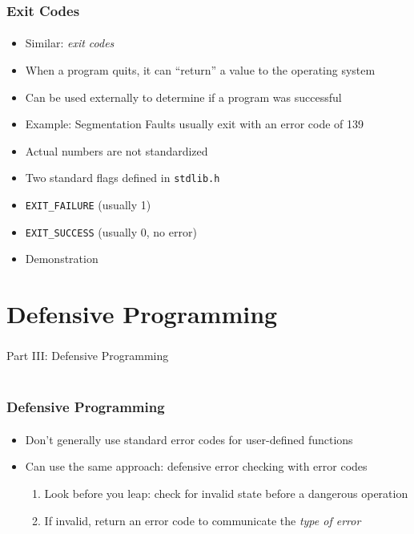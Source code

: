 \documentclass[]{beamer}
\begin{document}
\begin{frame}
    \frametitle{Exit Codes}
    \framesubtitle{}

\begin{itemize}[<+->]
  \item Similar: \emph{exit codes}
  \item When a program quits, it can ``return'' a value to the operating system
  \item Can be used externally to determine if a program was successful 
  \item Example: Segmentation Faults usually exit with an error code of 139
  \item Actual numbers are not standardized
  \item Two standard flags defined in \texttt{stdlib.h}
  \item \texttt{EXIT_FAILURE} (usually 1)
  \item \texttt{EXIT_SUCCESS} (usually 0, no error)
  \item Demonstration
\end{itemize}

\end{frame}


\section{Defensive Programming}

\begin{frame}
    \frametitle{}
    \framesubtitle{}
    
    \begin{center}
    {\Huge Part III: Defensive Programming}\\
    {\Large ~}
    \end{center}

\end{frame}

\begin{frame}
    \frametitle{Defensive Programming}
    \framesubtitle{}

\begin{itemize}[<+->]
  \item Don't generally use standard error codes for user-defined functions
  \item Can use the same approach: defensive error checking with error codes
  \begin{enumerate}
    \item Look before you leap: check for invalid state before a dangerous
    operation 
    \item If invalid, return an error code to communicate the \emph{type of error}
  \end{enumerate}
\end{itemize}
\end{frame}
\end{document}
